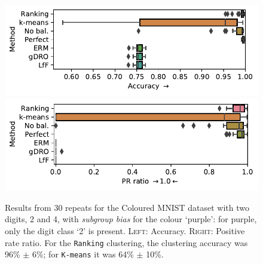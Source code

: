\begin{figure}[ht]
  \centering
  \includegraphics[width=\columnwidth]{paper3/figures/cmnist_2v4_partial_acc.pdf}
  \includegraphics[width=\columnwidth]{paper3/figures/cmnist_2v4_partial_prr.pdf}
  \caption{
    Results from 30 repeats for the Coloured MNIST dataset with two digits, 2 and 4, with \emph{subgroup bias} for the colour `{\color{purple}purple}': for {\color{purple}purple}, only the digit class `2' is present.
    \textsc{Left}: Accuracy.
    \textsc{Right}: Positive rate ratio.
    For the \texttt{Ranking} clustering, the clustering accuracy was 96\% $\pm$ 6\%;
    for \texttt{K-means} it was 64\% $\pm$ 10\%.
  }%
  \label{fig:cmnist-2v4-partial}
\end{figure}
